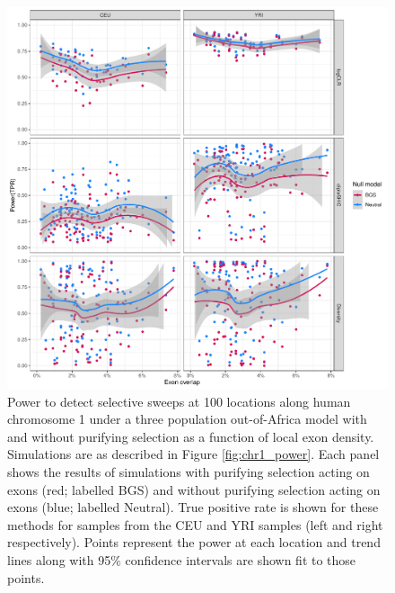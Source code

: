 \documentclass[hidelinks]{article}
\newcommand{\stopsupplement}{%
        \setcounter{table}{0}
        \renewcommand{\thetable}{\arabic{table}}%
        \setcounter{figure}{0}
        \renewcommand{\thefigure}{\arabic{figure}}%
     }
\begin{document}
\begin{figure}
    \centering
    \includegraphics[width=0.8 \textwidth]{figures/sweeps/relationship_power_exon.pdf}
    \caption{
    Power to detect selective sweeps at 100 locations along human chromosome 1 under a three population out-of-Africa model \citep{gutenkunst2009inferring}  
    with and without purifying selection as a function of local exon density.
    Simulations are as described in Figure \ref{fig:chr1_power}.
    Each panel shows the results of simulations with purifying selection acting on exons (red; labelled BGS)
    and without purifying selection acting on exons (blue; labelled Neutral).
    True positive rate is shown for these methods for samples from the CEU and YRI samples (left and right respectively).
    Points represent the power at each location and trend lines along with 95\% confidence intervals are shown fit to those points.
    }
    \label{fig:power-exon}
\end{figure}

\stopsupplement
\end{document}
